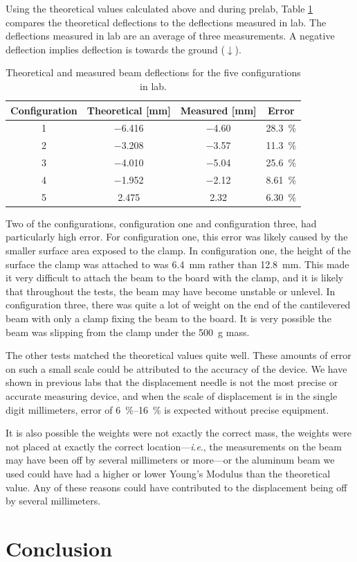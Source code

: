 \documentclass[12 pt]{article}
\newcommand{\ie}{\textit{i}.\textit{e}., }
\begin{document}
Using the theoretical values calculated above and during prelab, Table \ref{tbl:compare} compares the theoretical deflections to the deflections measured in lab. The deflections measured in lab are an average of three measurements. A negative deflection implies deflection is towards the ground ($\downarrow$).

\begin{table}[!htbp]
\caption{Theoretical and measured beam deflections for the five configurations in lab.}
\begin{center}
	\begin{tabular}{|c|c|c|c|}
		\hline
		Configuration&Theoretical [\unit{\mm}]&Measured [\unit{\mm}]&Error\\
		\hline
		1&\num{-6.416}&\num{-4.60}&\qty{28.3}{\percent}\\
		\hline
		2&\num{-3.208}&\num{-3.57}&\qty{11.3}{\percent}\\
		\hline
		3&\num{-4.010}&\num{-5.04}&\qty{25.6}{\percent}\\
		\hline
		4&\num{-1.952}&\num{-2.12}&\qty{8.61}{\percent}\\
		\hline
		5&\num{2.475}&\num{2.32}&\qty{6.30}{\percent}\\
		\hline
	\end{tabular}
\end{center}
\label{tbl:compare}
\end{table}

Two of the configurations, configuration one and configuration three, had particularly high error. For configuration one, this error was likely caused by the smaller surface area exposed to the clamp. In configuration one, the height of the surface the clamp was attached to was \qty{6.4}{\mm} rather than \qty{12.8}{\mm}. This made it very difficult to attach the beam to the board with the clamp, and it is likely that throughout the tests, the beam may have become unstable or unlevel. In configuration three, there was quite a lot of weight on the end of the cantilevered beam with only a clamp fixing the beam to the board. It is very possible the beam was slipping from the clamp under the \qty{500}{\g} mass.

The other tests matched the theoretical values quite well. These amounts of error on such a small scale could be attributed to the accuracy of the device. We have shown in previous labs that the displacement needle is not the most precise or accurate measuring device, and when the scale of displacement is in the single digit millimeters, error of \qtyrange{6}{16}{\percent} is expected without precise equipment.

It is also possible the weights were not exactly the correct mass, the weights were not placed at exactly the correct location---\ie the measurements on the beam may have been off by several millimeters or more---or the aluminum beam we used could have had a higher or lower Young's Modulus than the theoretical value. Any of these reasons could have contributed to the displacement being off by several millimeters.

\section{Conclusion} \label{conclusion}
\end{document}
